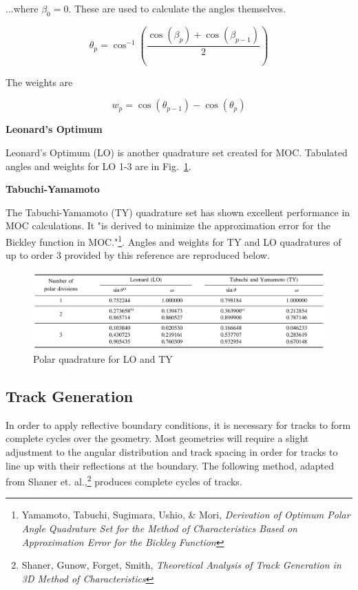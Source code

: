 \documentclass[12pt]{article}
\begin{document}
...where $\beta_0 = 0$. These are used to calculate the angles themselves.

\begin{equation}\label{eq:equalangles}
\theta_p = \cos^{-1} \left( \frac{\cos(\beta_p) + \cos(\beta_{p-1})}{2} \right)
\end{equation}

The weights are 

\begin{equation}\label{eq:equalweights}
w_p = \cos(\theta_{p-1}) - \cos(\theta_p)
\end{equation}

\textbf{Leonard's Optimum}

Leonard's Optimum (LO) is another quadrature set created for MOC. Tabulated angles and weights for LO 1-3 are in Fig.~\ref{fig:tylo}.

\textbf{Tabuchi-Yamamoto}

The Tabuchi-Yamamoto (TY) quadrature set has shown excellent performance in MOC calculations. 
It "is derived to minimize the approximation error for the Bickley function in MOC."\footnote{Yamamoto, Tabuchi, Sugimara, Ushio, \& Mori, \textit{Derivation of Optimum Polar Angle Quadrature Set for the Method of Characteristics Based on Approximation Error for the Bickley Function}}. Angles and weights for TY and LO quadratures of up to order 3 provided by this reference are reproduced below.

\begin{figure}[h]
\centering
\includegraphics[width=\textwidth]{figs/TabuchiTable.png}
\caption{Polar quadrature for LO and TY}
\label{fig:tylo}
\end{figure}


\subsection{Track Generation}\label{sec:trackgenerator}

In order to apply reflective boundary conditions, it is necessary for tracks to form complete cycles over the geometry. Most geometries will require a slight adjustment to the angular distribution and track spacing in order for tracks to line up with their reflections at the boundary. The following method, adapted from Shaner et. al.,\footnote{Shaner, Gunow, Forget, Smith, \textit{Theoretical Analysis of Track Generation in 3D Method of Characteristics}} produces complete cycles of tracks.
\end{document}
